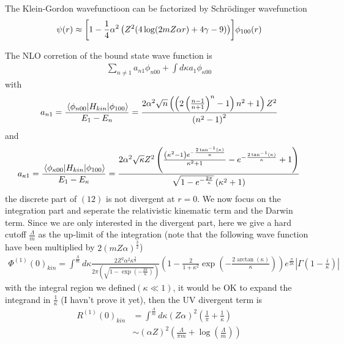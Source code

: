 \documentclass[aps,prd,preprint,showkeys,10pt]{revtex4-1}
\newcommand{\ka}{\kappa}
\begin{document}
The Klein-Gordon wavefunctioon can be factorized by Schr\"odinger wavefunction
\begin{align*}
	\psi(r)\approx\bqty{1-\frac{1}{4} \alpha ^2 \left(Z^2 (4 \log (2mZ\alpha r)+4 \gamma -9)\right)}\phi_{100}(r)
\end{align*}

The NLO corretion of the bound state wave function is
\begin{align}
	\sum_{n\neq 1}a_{n1}\phi_{n00}+\int d\ka a_{1}\phi_{\ka00}
\end{align}
with
\begin{align*}
	a_{n1}=\frac{\mel{\phi_{n00}}{H_{kin}}{\phi_{100}}}{E_1-E_n}=\frac{2 \alpha ^2 \sqrt{n} \left(\left(2 \left(\frac{n-1}{n+1}\right)^n-1\right) n^2+1\right) Z^2}{\left(n^2-1\right)^2}
\end{align*}
and
\begin{align*}
	a_{\ka1}=\frac{\mel{\phi_{\ka00}}{H_{kin}}{\phi_{100}}}{E_1-E_{\ka}}
	=\frac{2 \alpha ^2 \sqrt{\kappa } Z^2 \left(\frac{\left(\kappa ^2-1\right) e^{-\frac{2 \tan ^{-1}(\kappa )}{\kappa }}}{\kappa ^2+1}-e^{-\frac{2 \tan ^{-1}(\kappa )}{\kappa }}+1\right)}{\sqrt{1-e^{-\frac{2 \pi }{\kappa }}} \left(\kappa ^2+1\right)}
\end{align*}
the discrete part of $(12)$ is not divergent at $r=0$. We now focus on the integration part and seperate the relativistic kinematic term and the Darwin term. Since we are only interested in the divergent part, here we give a hard cutoff $\frac{\Lambda}{m}$ as the up-limit of the integration  (note that the following wave function have been multiplied by $2(mZ\alpha)^\frac{3}{2}$)
\begin{align}
	\Phi^{(1)}(0)_{kin}=\int^\frac{\Lambda}{m}d\ka \frac{2Z^2\alpha^2\ka^\frac{3}{2}}{2\pi(\sqrt{1-\exp(-\frac{2 \pi}{\ka})})}(1-\frac{2}{1+\ka^2}\exp(-\frac{2\arctan(\ka)}{\ka}))e^\frac{\pi}{2\ka}|\Gamma(1-\frac{i}{\ka})|
\end{align}
with the integral region we defined$(\ka\ll1)$, it would be OK to expand the integrand in $\frac{1}{\ka}$ (I havn't prove it yet), then the UV divergent term is
\begin{align}
	R^{(1)}(0)_{kin} & =\int^\frac{\Lambda}{m}d\ka(Z\alpha)^2(\frac{1}{\pi}+\frac{1}{\ka}) \\
	                 & \sim(\alpha Z)^2(\frac{\Lambda}{\pi m}+\log(\frac{\Lambda}{m}))
\end{align}
\end{document}
